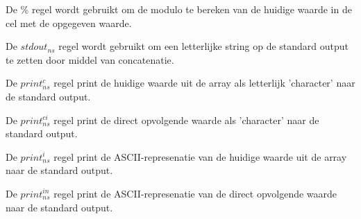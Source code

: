\documentclass[11pt]{article}
\begin{document}
De \% regel wordt gebruikt om de modulo te bereken van de huidige waarde in de cel met de opgegeven waarde.
\begin{prooftree}
\end{prooftree}

\begin{prooftree}
\end{prooftree}



De $stdout_{ns}$ regel wordt gebruikt om een letterlijke string op de standard output te zetten door middel van concatenatie.
\begin{prooftree}
\end{prooftree}


De $print^c_{ns}$ regel print de huidige waarde uit de array als letterlijk 'character' naar de standard output.
\begin{prooftree}
\end{prooftree}

De $print^{ci}_{ns}$ regel print de direct opvolgende waarde als 'character' naar de standard output.
\begin{prooftree}
\end{prooftree}

De $print^i_{ns}$ regel print de ASCII-represenatie van de huidige waarde uit de array naar de standard output.
\begin{prooftree}
\end{prooftree}

De $print^{in}_{ns}$ regel print de ASCII-represenatie van de direct opvolgende waarde naar de standard output.
\begin{prooftree}
\end{prooftree}
\end{document}
